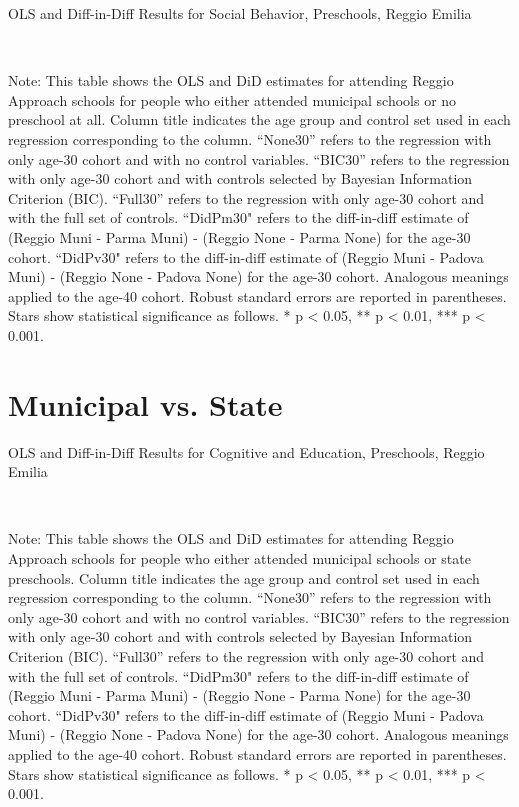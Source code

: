 \begin{landscape}
\begin{table}[H] \caption{OLS and Diff-in-Diff Results for Social Behavior, Preschools, Reggio Emilia} \label{ols-S-reg}
\scalebox{0.85}{
}
\vspace{1ex} \\
\footnotesize\raggedright{Note: This table shows the OLS and DiD estimates for attending Reggio Approach schools for people who either attended municipal schools or no preschool at all. Column title indicates the age group and control set used in each regression corresponding to the column. ``None30'' refers to the regression with only age-30 cohort and with no control variables. ``BIC30'' refers to the regression with only age-30 cohort and with controls selected by Bayesian Information Criterion (BIC). ``Full30'' refers to the regression with only age-30 cohort and with the full set of controls. ``DidPm30" refers to the diff-in-diff estimate of (Reggio Muni - Parma Muni) - (Reggio None - Parma None) for the age-30 cohort. ``DidPv30" refers to the diff-in-diff estimate of (Reggio Muni - Padova Muni) - (Reggio None - Padova None) for the age-30 cohort. Analogous meanings applied to the age-40 cohort. Robust standard errors are reported in parentheses. Stars show statistical significance as follows. * p < 0.05, ** p < 0.01, *** p < 0.001.}
\end{table}



\section{Municipal vs. State}
\begin{table}[H] \caption{OLS and Diff-in-Diff Results for Cognitive and Education, Preschools, Reggio Emilia} \label{ols-E-reg}
\scalebox{0.85}{}
\vspace{1ex} \\
\footnotesize\raggedright{Note: This table shows the OLS and DiD estimates for attending Reggio Approach schools for people who either attended municipal schools or state preschools. Column title indicates the age group and control set used in each regression corresponding to the column. ``None30'' refers to the regression with only age-30 cohort and with no control variables. ``BIC30'' refers to the regression with only age-30 cohort and with controls selected by Bayesian Information Criterion (BIC). ``Full30'' refers to the regression with only age-30 cohort and with the full set of controls. ``DidPm30" refers to the diff-in-diff estimate of (Reggio Muni - Parma Muni) - (Reggio None - Parma None) for the age-30 cohort. ``DidPv30" refers to the diff-in-diff estimate of (Reggio Muni - Padova Muni) - (Reggio None - Padova None) for the age-30 cohort. Analogous meanings applied to the age-40 cohort. Robust standard errors are reported in parentheses. Stars show statistical significance as follows. * p < 0.05, ** p < 0.01, *** p < 0.001.}
\end{table}


\end{landscape}
